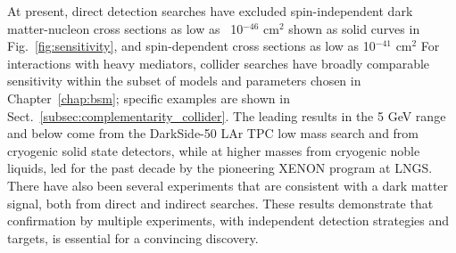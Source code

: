 \documentclass[../report.tex]{subfiles}
\begin{document}
%
At present, direct detection searches have excluded spin-independent dark matter-nucleon cross sections as low as ~10$^{-46}$ cm$^2$ %
shown as solid curves in Fig.~\ref{fig:sensitivity}, and spin-dependent cross sections as low as 10$^{-41}$ cm$^2$
For interactions with heavy mediators, collider searches have broadly comparable sensitivity within the subset of models and parameters chosen in Chapter~\ref{chap:bsm};
specific examples are shown in Sect.~\ref{subsec:complementarity_collider}.  The leading results in the 5 GeV range and below come from the DarkSide-50 LAr TPC low mass search and from cryogenic solid state detectors, while at higher masses from cryogenic noble liquids, led for the past decade by the pioneering XENON program at LNGS.  There have also been several experiments that are consistent with a dark matter signal, both from direct 
and indirect
searches. These results demonstrate that confirmation by multiple experiments, with independent detection strategies and targets, is essential for a convincing discovery.
%
\end{document}
